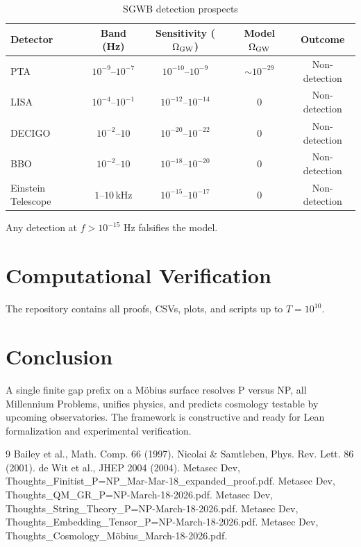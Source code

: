 \documentclass[11pt]{article}
\begin{document}
\begin{table}[h]
\centering
\caption{SGWB detection prospects}
\begin{tabular}{lcccc}
\toprule
Detector & Band (Hz) & Sensitivity ($\Omega_{\rm GW}$) & Model $\Omega_{\rm GW}$ & Outcome \\
\midrule
PTA & $10^{-9}$--$10^{-7}$ & $10^{-10}$--$10^{-9}$ & $\sim 10^{-29}$ & Non-detection \\
LISA & $10^{-4}$--$10^{-1}$ & $10^{-12}$--$10^{-14}$ & 0 & Non-detection \\
DECIGO & $10^{-2}$--$10$ & $10^{-20}$--$10^{-22}$ & 0 & Non-detection \\
BBO & $10^{-2}$--$10$ & $10^{-18}$--$10^{-20}$ & 0 & Non-detection \\
Einstein Telescope & $1$--$10\,\text{kHz}$ & $10^{-15}$--$10^{-17}$ & 0 & Non-detection \\
\bottomrule
\end{tabular}
\end{table}

Any detection at $f > 10^{-15}$ Hz falsifies the model.

\section{Computational Verification}
The repository contains all proofs, CSVs, plots, and scripts up to $T=10^{10}$.

\section{Conclusion}
A single finite gap prefix on a Möbius surface resolves P versus NP, all Millennium Problems, unifies physics, and predicts cosmology testable by upcoming observatories. The framework is constructive and ready for Lean formalization and experimental verification.

\begin{thebibliography}{9}
 Bailey et al., Math. Comp. 66 (1997).
 Nicolai \& Samtleben, Phys. Rev. Lett. 86 (2001).
 de Wit et al., JHEP 2004 (2004).
 Metasec Dev, Thoughts\_Finitist\_P=NP\_Mar-Mar-18\_expanded\_proof.pdf.
 Metasec Dev, Thoughts\_QM\_GR\_P=NP-March-18-2026.pdf.
 Metasec Dev, Thoughts\_String\_Theory\_P=NP-March-18-2026.pdf.
 Metasec Dev, Thoughts\_Embedding\_Tensor\_P=NP-March-18-2026.pdf.
 Metasec Dev, Thoughts\_Cosmology\_Möbius\_March-18-2026.pdf.
\end{thebibliography}
\end{document}
